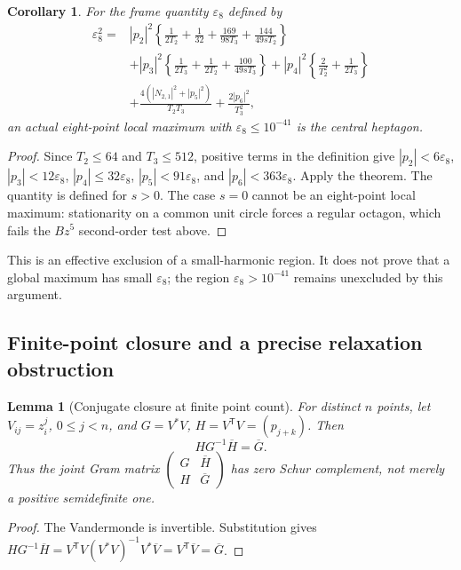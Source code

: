 \documentclass[11pt]{article}
\newtheorem{lemma}[theorem]{Lemma}
\newtheorem{corollary}[theorem]{Corollary}
\theoremstyle{remark}
\numberwithin{equation}{section}
\begin{document}
\begin{corollary}\label{cor:noclass-n8-frame-gap}
For the frame quantity $\varepsilon_8$ defined by
\begin{align*}
 \varepsilon_8^2={}&|p_2|^2\left\{\frac1{2T_2}+\frac1{32}
 +\frac{169}{98T_3}+\frac{144}{49sT_2}\right\}\\
 &+|p_3|^2\left\{\frac1{2T_3}+\frac1{2T_2}+\frac{100}{49sT_3}\right\}
 +|p_4|^2\left\{\frac2{T_2^2}+\frac1{2T_3}\right\}\\
 &+\frac{4(|N_{2,1}|^2+|p_5|^2)}{T_2T_3}
 +\frac{2|p_6|^2}{T_3^2},
\end{align*}
an actual eight-point local maximum with $\varepsilon_8\le10^{-41}$
is the central heptagon.
\end{corollary}
\begin{proof}
Since $T_2\le64$ and $T_3\le512$, positive terms in the definition give
$|p_2|<6\varepsilon_8$, $|p_3|<12\varepsilon_8$,
$|p_4|\le32\varepsilon_8$, $|p_5|<91\varepsilon_8$, and
$|p_6|<363\varepsilon_8$. Apply the theorem. The quantity is defined
for $s>0$. The case $s=0$ cannot be an eight-point local maximum:
stationarity on a common unit circle forces a regular octagon, which
fails the $Bz^5$ second-order test above.
\end{proof}
This is an effective exclusion of a small-harmonic region. It does
not prove that a global maximum has small $\varepsilon_8$; the region
$\varepsilon_8>10^{-41}$ remains unexcluded by this argument.

\subsection{Finite-point closure and a precise relaxation obstruction}
\begin{lemma}[Conjugate closure at finite point count]
\label{lem:noclass-conjugate-closure}
For distinct $n$ points, let $V_{ij}=z_i^j$, $0\le j<n$, and
$G=V^*V$, $H=V^{\mathsf T}V=(p_{j+k})$. Then
\[
 H G^{-1}\overline H=\overline G.
\]
Thus the joint Gram matrix
$\left(\begin{smallmatrix}G&\overline H\\H&\overline G\end{smallmatrix}\right)$
has zero Schur complement, not merely a positive semidefinite one.
\end{lemma}
\begin{proof}
The Vandermonde is invertible. Substitution gives
$HG^{-1}\overline H=V^{\mathsf T}V(V^*V)^{-1}V^*\overline V
=V^{\mathsf T}\overline V=\overline G$.
\end{proof}
\end{document}
